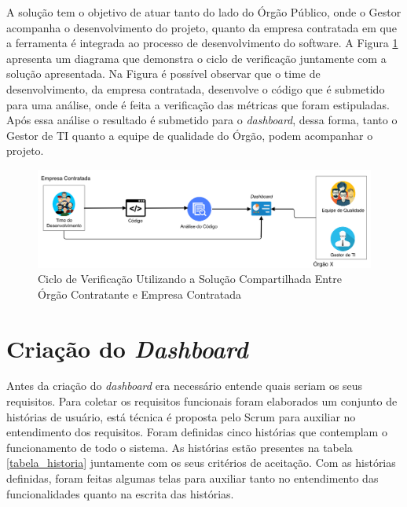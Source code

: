 A solução tem o objetivo de atuar tanto do lado do Órgão Público, onde o Gestor acompanha o desenvolvimento do projeto, quanto da empresa contratada em que a ferramenta é integrada ao processo de desenvolvimento do software. A Figura \ref{img:ciclo_ver} apresenta um diagrama que demonstra o ciclo de verificação juntamente com a solução apresentada. Na Figura é possível observar que o time de desenvolvimento, da empresa contratada, desenvolve o código que é submetido para uma análise, onde é feita a verificação das métricas que foram estipuladas. Após essa análise o resultado é submetido para o \textit{dashboard},  dessa forma, tanto o Gestor de TI quanto a equipe de qualidade do Órgão, podem acompanhar o projeto. 

\graphicspath{{figuras/}}
\begin{figure}[!]
\centering
\includegraphics[scale=0.30]{proc_ver.png}
\caption{Ciclo de Verificação Utilizando a Solução Compartilhada Entre Órgão Contratante e Empresa Contratada}
\label{img:ciclo_ver}
\end{figure}


\section{Criação do \textit{Dashboard}}

Antes da criação do \textit{dashboard} era necessário entende quais seriam os seus requisitos. Para coletar os requisitos funcionais foram elaborados um conjunto de histórias de usuário, está técnica é proposta pelo Scrum para auxiliar no entendimento dos requisitos. Foram definidas cinco histórias que contemplam o funcionamento de todo o sistema. As histórias estão presentes na tabela \ref{tabela_historia} juntamente com os seus critérios de aceitação. Com as histórias definidas, foram feitas algumas telas para auxiliar tanto no entendimento das funcionalidades quanto na escrita das histórias. 

